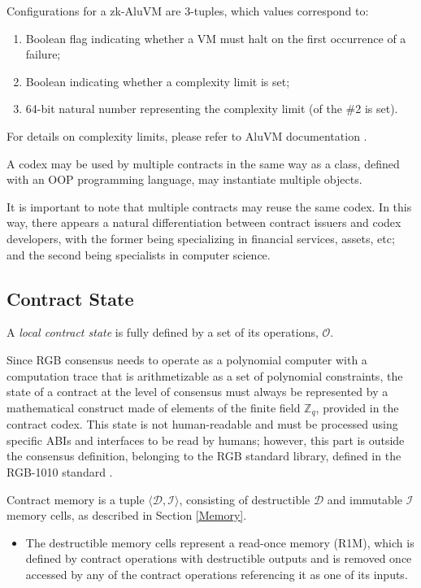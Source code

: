 \documentclass[9pt,oneside]{amsart}
\begin{document}
\begin{multicols}{2}

Configurations for a zk-AluVM are 3-tuples, which values correspond to:
\begin{enumerate}
\item Boolean flag indicating whether a VM must halt on the first occurrence of a failure;
\item Boolean indicating whether a complexity limit is set;
\item 64-bit natural number representing the complexity limit (of the \#2 is set).
\end{enumerate}

For details on complexity limits, please refer to AluVM documentation \cite{AluVM}.

A codex may be used by multiple contracts in the same way as a class,
defined with an OOP programming language, may instantiate multiple objects.

It is important to note that multiple contracts may reuse the same codex.
In this way, there appears a natural differentiation between contract issuers and codex developers,
with the former being specializing in financial services, assets, etc;
and the second being specialists in computer science.


\subsection{Contract State}

A \emph{local contract state} is fully defined by a set of its operations, $\mathcal{O}$.

Since RGB consensus needs to operate as a polynomial computer with a computation trace that is
arithmetizable as a set of polynomial constraints, the state of a contract at the level of
consensus must always be represented by a mathematical construct
made of elements of the finite field $\mathbb{Z}_q$, provided in the contract codex.
This state is not human-readable and must be processed using specific ABIs and interfaces
to be read by humans; however, this part is outside the consensus definition, belonging
to the RGB standard library, defined in the RGB-1010 standard \cite{RGB1010}.

Contract memory is a tuple $\langle \mathcal{D}, \mathcal{I} \rangle$,
consisting of destructible $\mathcal{D}$ and immutable $\mathcal{I}$ memory cells,
as described in Section \ref{Memory}.

\begin{itemize}
\item The destructible memory cells represent a \gls{read-once memory} (R1M),
  which is defined by contract operations with destructible outputs
  and is removed once accessed by any of the contract operations referencing it as one of its inputs.


\end{itemize}
\end{multicols}
\end{document}
